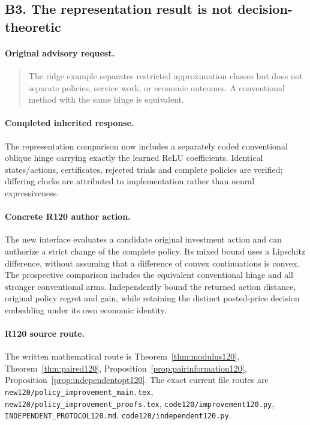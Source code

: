 \subsection{B3. The representation result is not decision-theoretic}
\label{response120:B3}
\paragraph{Original advisory request.}
\begin{quote}
The ridge example separates restricted approximation classes but does not separate policies, service work, or economic outcomes. A conventional method with the same hinge is equivalent.
\end{quote}
\paragraph{Completed inherited response.}
The representation comparison now includes a separately coded conventional oblique hinge carrying exactly the learned ReLU coefficients. Identical states/actions, certificates, rejected trials and complete policies are verified; differing clocks are attributed to implementation rather than neural expressiveness.
\paragraph{Concrete R120 author action.}
The new interface evaluates a candidate original investment action and can authorize a strict change of the complete policy. Its mixed bound uses a Lipschitz difference, without assuming that a difference of convex continuations is convex. The prospective comparison includes the equivalent conventional hinge and all stronger conventional arms. Independently bound the returned action distance, original policy regret and gain, while retaining the distinct posted-price decision embedding under its own economic identity.
\paragraph{R120 source route.}
The written mathematical route is Theorem~\ref{thm:modulus120}, Theorem~\ref{thm:paired120}, Proposition~\ref{prop:pairinformation120}, Proposition~\ref{prop:independentopt120}. The exact current file routes are \nolinkurl{new120/policy_improvement_main.tex}, \nolinkurl{new120/policy_improvement_proofs.tex}, \nolinkurl{code120/improvement120.py}, \nolinkurl{INDEPENDENT_PROTOCOL120.md}, \nolinkurl{code120/independent120.py}.
